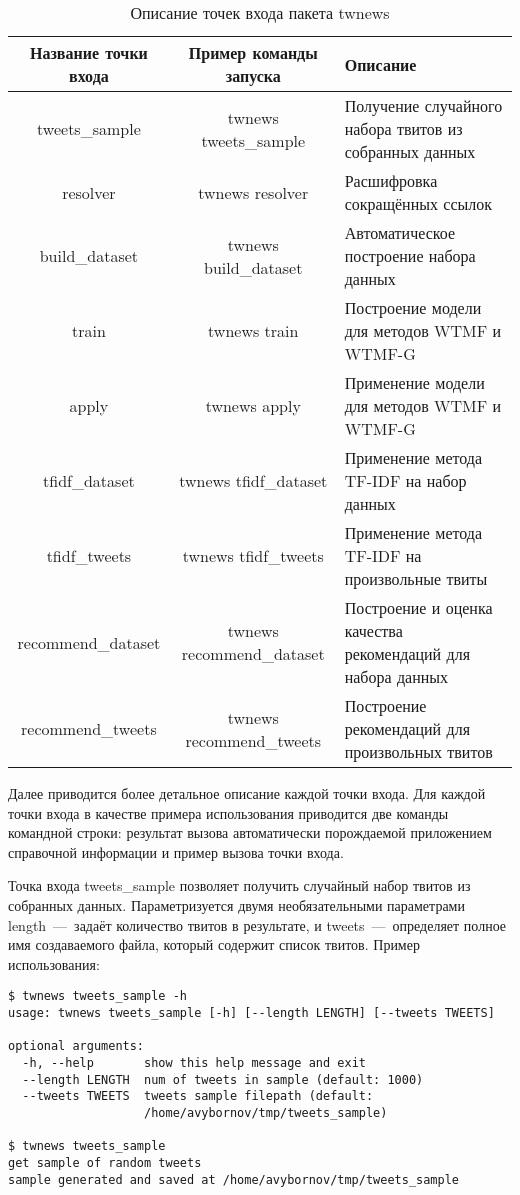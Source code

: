          \begin{table}[h!]
            \small
            \caption{Описание точек входа пакета twnews \bigskip}
            \center

            \label{tabular:entry_point}
            \begin{tabular}{|c|c|m{6cm}|}
                \hline
                \bf{Название точки входа} & \bf{Пример команды запуска} & \bf{Описание} \\ \hline
                tweets\_sample & twnews tweets\_sample & Получение случайного набора твитов из собранных данных \\ \hline
                resolver & twnews resolver & Расшифровка сокращённых ссылок \\ \hline
                build\_dataset & twnews build\_dataset & Автоматическое построение набора данных \\ \hline
                train & twnews train & Построение модели для методов WTMF и WTMF-G \\ \hline
                apply & twnews apply & Применение модели для методов WTMF и WTMF-G \\ \hline
                tfidf\_dataset & twnews tfidf\_dataset & Применение метода TF-IDF на набор данных \\ \hline
                tfidf\_tweets & twnews tfidf\_tweets & Применение метода TF-IDF на произвольные твиты\\ \hline
                recommend\_dataset & twnews recommend\_dataset & Построение и оценка качества рекомендаций для набора данных \\ \hline
                recommend\_tweets & twnews recommend\_tweets & Построение рекомендаций для произвольных твитов \\ \hline
            \end{tabular}
        \end{table}
        Далее приводится более детальное описание каждой точки входа. Для каждой точки входа в качестве примера использования
        приводится две команды командной строки: результат вызова автоматически порождаемой приложением справочной информации и пример вызова точки входа.


        Точка входа tweets\_sample позволяет получить случайный набор твитов из собранных данных. Параметризуется двумя необязательными параметрами
        length~---~задаёт количество твитов в результате, и tweets~---~определяет полное имя создаваемого файла, который содержит список твитов.
        Пример использования:
        \begin{lstlisting}
$ twnews tweets_sample -h
usage: twnews tweets_sample [-h] [--length LENGTH] [--tweets TWEETS]

optional arguments:
  -h, --help       show this help message and exit
  --length LENGTH  num of tweets in sample (default: 1000)
  --tweets TWEETS  tweets sample filepath (default:
                   /home/avybornov/tmp/tweets_sample)

$ twnews tweets_sample
get sample of random tweets
sample generated and saved at /home/avybornov/tmp/tweets_sample
        \end{lstlisting}


